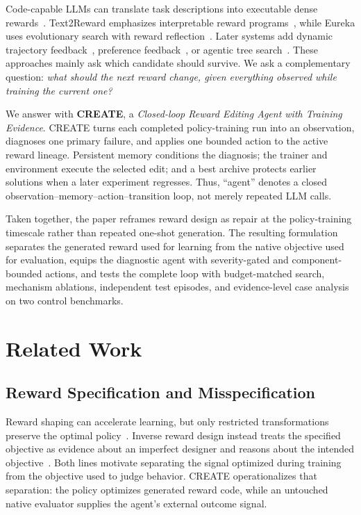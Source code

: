 \documentclass[conference]{IEEEtran}
\begin{document}
Code-capable LLMs can translate task descriptions into executable dense
rewards~\cite{language2rewards}. Text2Reward emphasizes interpretable reward
programs~\cite{text2reward}, while Eureka uses evolutionary search with reward
reflection~\cite{eureka}. Later systems add dynamic trajectory
feedback~\cite{card}, preference feedback~\cite{revolve}, or agentic tree
search~\cite{rfagent}. These
approaches mainly ask which candidate should survive. We ask a complementary
question: \emph{what should the next reward change, given everything observed
while training the current one?}

We answer with \textbf{CREATE}, a \emph{Closed-loop Reward Editing Agent with
Training Evidence}. CREATE turns each completed policy-training run into an
observation, diagnoses one primary failure, and applies one bounded action to
the active reward lineage. Persistent memory conditions the diagnosis; the
trainer and environment execute the selected edit; and a best archive protects
earlier solutions when a later experiment regresses. Thus, ``agent'' denotes a
closed observation--memory--action--transition loop, not merely repeated LLM
calls.

Taken together, the paper reframes reward design as repair at the
policy-training timescale rather than repeated one-shot generation. The
resulting formulation separates the generated reward used for learning from
the native objective used for evaluation, equips the diagnostic agent with
severity-gated and component-bounded actions, and tests the complete loop with
budget-matched search, mechanism ablations, independent test episodes, and
evidence-level case analysis on two control benchmarks.

\section{Related Work}
\subsection{Reward Specification and Misspecification}
Reward shaping can accelerate learning, but only restricted transformations
preserve the optimal policy~\cite{ng1999policy}. Inverse reward design instead
treats the specified objective as evidence about an imperfect designer and
reasons about the intended objective~\cite{hadfield2017inverse}. Both lines
motivate separating the signal optimized during training from the objective
used to judge behavior. CREATE operationalizes that separation: the policy
optimizes generated reward code, while an untouched native evaluator supplies
the agent's external outcome signal.
\end{document}
